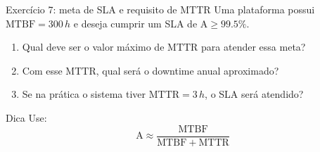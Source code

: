\documentclass{beamer}
\newif\ifshowsolutions
\newcommand{\A}{\mathrm{A}}
\newcommand{\MTBF}{\mathrm{MTBF}}
\newcommand{\MTTR}{\mathrm{MTTR}}
\begin{document}
\begin{frame}{Exercício 7: meta de SLA e requisito de MTTR}
Uma plataforma possui \(\MTBF=300\,h\) e deseja cumprir um SLA de
\(\A \ge 99.5\%\).

\begin{enumerate}
  \item Qual deve ser o valor máximo de \(\MTTR\) para atender essa meta?
  \item Com esse \(\MTTR\), qual será o downtime anual aproximado?
  \item Se na prática o sistema tiver \(\MTTR=3\,h\), o SLA será atendido?
\end{enumerate}

\begin{block}{Dica}
Use:
\[
\A \approx \frac{\MTBF}{\MTBF+\MTTR}
\]
\end{block}
\end{frame}

\ifshowsolutions
\begin{frame}{Gabarito Exercício 7}
\scriptsize
\begin{itemize}
  \item \textbf{MTTR máximo}: resolver \(\dfrac{300}{300+\MTTR}\ge 0.995\):
  \[
  300 \ge 298.5 + 0.995\,\MTTR
  \;\Rightarrow\;
  \MTTR \le \frac{1.5}{0.995} \approx \mathbf{1.51\,h}\ (\approx 1\,h\,30\,min)
  \]

  \item \textbf{Downtime anual} para \(\A=99.5\%\):
  \[
  (1-0.995)\times 8760 = 43.8\,h/ano
  \]

  \item \textbf{Se \(\MTTR=3\,h\)}:
  \[
  \A=\frac{300}{303}\approx 0.9901 = 99.01\%
  \quad\Rightarrow\quad \textbf{não atende} \text{ ao SLA de 99.5\%}
  \]
\end{itemize}
\end{frame}
\fi
\end{document}
